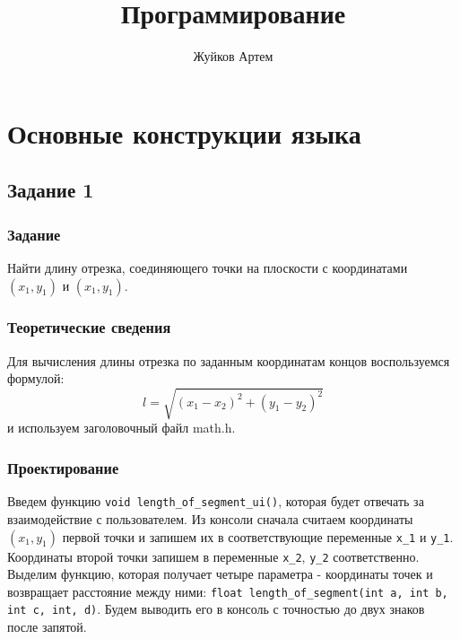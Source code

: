 \documentclass[12pt,a4paper]{report}
\author{Жуйков Артем}
\title{Программирование}
\begin{document}
\listoftodos
\maketitle
\chapter{Основные конструкции языка}
\section{Задание 1}
\subsection{Задание}
Найти длину отрезка, соединяющего точки на плоскости с координатами $(x_1, y_1)$ и $(x_1 , y_1)$.

\subsection{Теоретические сведения}


Для вычисления длины отрезка по заданным координатам концов воспользуемся формулой:
\begin{equation}
l = \sqrt{(x_1 - x_2)^2 + (y_1 - y_2)^2}
\end{equation}
и используем заголовочный файл math.h.

\subsection{Проектирование}
Введем функцию \verb+void length_of_segment_ui()+, которая будет отвечать за взаимодействие с пользователем. Из консоли сначала считаем координаты $ (x_1, y_1) $ первой точки и запишем их в соответствующие переменные \verb+х_1+ и \verb+у_1+.
Координаты второй точки запишем в переменные \verb+x_2+, \verb+y_2+ соответственно.
Выделим функцию, которая получает четыре параметра - координаты точек и возвращает расстояние между ними: \verb+float length_of_segment(int a, int b, int c, int, d)+. Будем выводить его в консоль с точностью до двух знаков после запятой.
\end{document}
